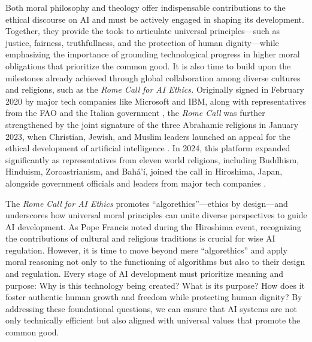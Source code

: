 \documentclass[%
  manuscript=article,
  year=2024,
  volume=77,
  doi=10.59203/zfn.77.707,
]{zfn}
\begin{document}
Both moral philosophy and theology offer indispensable contributions to the ethical discourse on AI and must be actively engaged in shaping its development. Together, they provide the tools to articulate universal principles---such as justice, fairness, truthfullness, and the protection of human dignity---while emphasizing the importance of grounding technological progress in higher moral obligations that prioritize the common good. It is also time to build upon the milestones already achieved through global collaboration among diverse cultures and religions, such as the \textit{Rome Call} \textit{for AI Ethics.} Originally signed in February 2020 by major tech companies like Microsoft and IBM, along with representatives from the FAO and the Italian government 
\parencite[][]{nelson_rome_2022}, %
 the \textit{Rome Call} was further strengthened by the joint signature of the three Abrahamic religions in January 2023, when Christian, Jewish, and Muslim leaders launched an appeal for the ethical development of artificial intelligence 
\parencite[][]{renaissance_foundation_ai_2023}. %
 In 2024, this platform expanded significantly as representatives from eleven world religions, including Buddhism, Hinduism, Zoroastrianism, and Bahá'í, joined the call in Hiroshima, Japan, alongside government officials and leaders from major tech companies 
\parencite[][]{vatican_press_office_ai_2024}.%




The \textit{Rome Call for AI Ethics} promotes ``algorethics''---ethics by design---and underscores how universal moral principles can unite diverse perspectives to guide AI development. As Pope Francis noted during the Hiroshima event, recognizing the contributions of cultural and religious traditions is crucial for wise AI regulation. However, it is time to move beyond mere ``algorethics'' and apply moral reasoning not only to the functioning of algorithms but also to their design and regulation. Every stage of AI development must prioritize meaning and purpose: Why is this technology being created? What is its purpose? How does it foster authentic human growth and freedom while protecting human dignity? By addressing these foundational questions, we can ensure that AI systems are not only technically efficient but also aligned with universal values that promote the common good.
\end{document}
